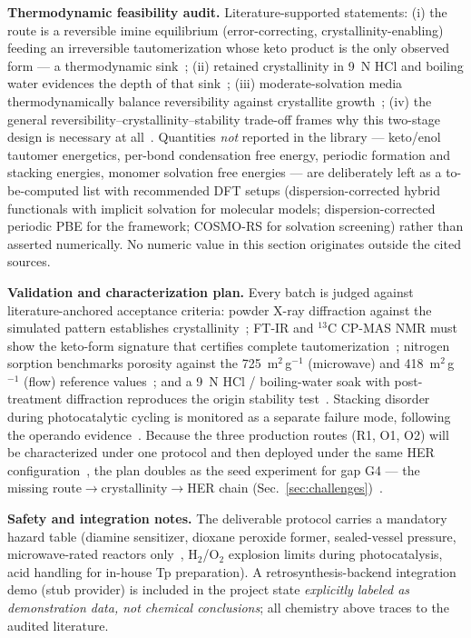 \textbf{Thermodynamic feasibility audit.} Literature-supported statements: (i) the route is a
reversible imine equilibrium (error-correcting, crystallinity-enabling) feeding an irreversible
tautomerization whose keto product is the only observed form --- a thermodynamic
sink~\cite{kandambeth2012construction}; (ii) retained crystallinity in 9~N HCl and boiling
water evidences the depth of that sink~\cite{kandambeth2012construction,biswal2013mechanochemical};
(iii) moderate-solvation media thermodynamically balance reversibility against crystallite
growth~\cite{xu2026structural}; (iv) the general reversibility--crystallinity--stability
trade-off frames why this two-stage design is necessary at
all~\cite{haase2020solving,zhang2022reconstructed}. Quantities \emph{not} reported in the
library --- keto/enol tautomer energetics, per-bond condensation free energy, periodic
formation and stacking energies, monomer solvation free energies --- are deliberately left as a
to-be-computed list with recommended DFT setups (dispersion-corrected hybrid functionals with
implicit solvation for molecular models; dispersion-corrected periodic PBE for the framework;
COSMO-RS for solvation screening) rather than asserted numerically. No numeric value in this
section originates outside the cited sources.

\textbf{Validation and characterization plan.} Every batch is judged against
literature-anchored acceptance criteria: powder X-ray diffraction against the simulated
pattern establishes crystallinity~\cite{kandambeth2012construction}; FT-IR and $^{13}$C
CP-MAS NMR must show the keto-form signature that certifies complete
tautomerization~\cite{kandambeth2012construction}; nitrogen sorption benchmarks porosity
against the 725~m$^2$\,g$^{-1}$ (microwave) and 418~m$^2$\,g$^{-1}$ (flow) reference
values~\cite{grenu2020microwave,xu2026structural}; and a 9~N HCl / boiling-water soak with
post-treatment diffraction reproduces the origin stability test~\cite{kandambeth2012construction}.
Stacking disorder during photocatalytic cycling is monitored as a separate failure mode,
following the operando evidence~\cite{zhou2021peg}. Because the three production routes (R1,
O1, O2) will be characterized under one protocol and then deployed under the same HER
configuration~\cite{sheng2019effect}, the plan doubles as the seed experiment for gap G4 ---
the missing route$\rightarrow$crystallinity$\rightarrow$HER chain
(Sec.~\ref{sec:challenges})~\cite{ghosh2020identification}.

\textbf{Safety and integration notes.} The deliverable protocol carries a mandatory hazard
table (diamine sensitizer, dioxane peroxide former, sealed-vessel pressure, microwave-rated
reactors only~\cite{grenu2020microwave}, H$_2$/O$_2$ explosion limits during photocatalysis,
acid handling for in-house Tp preparation). A retrosynthesis-backend integration demo (stub
provider) is included in the project state \emph{explicitly labeled as demonstration data, not
chemical conclusions}; all chemistry above traces to the audited literature.
